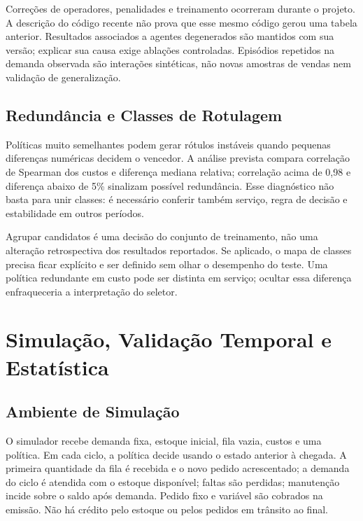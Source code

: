 Correções de operadores, penalidades e treinamento ocorreram durante o projeto. A descrição do código recente não prova que esse mesmo código gerou uma tabela anterior. Resultados associados a agentes degenerados são mantidos com sua versão; explicar sua causa exige ablações controladas. Episódios repetidos na demanda observada são interações sintéticas, não novas amostras de vendas nem validação de generalização.

\subsection{Redundância e Classes de Rotulagem}
\label{sec:redundancia_portfolio}

Políticas muito semelhantes podem gerar rótulos instáveis quando pequenas diferenças numéricas decidem o vencedor. A análise prevista compara correlação de Spearman dos custos e diferença mediana relativa; correlação acima de 0,98 e diferença abaixo de 5\% sinalizam possível redundância. Esse diagnóstico não basta para unir classes: é necessário conferir também serviço, regra de decisão e estabilidade em outros períodos.

Agrupar candidatos é uma decisão do conjunto de treinamento, não uma alteração retrospectiva dos resultados reportados. Se aplicado, o mapa de classes precisa ficar explícito e ser definido sem olhar o desempenho do teste. Uma política redundante em custo pode ser distinta em serviço; ocultar essa diferença enfraqueceria a interpretação do seletor.

\section{Simulação, Validação Temporal e Estatística}
\label{sec:simulacao_benchmark}
\subsection{Ambiente de Simulação}
\label{sec:ambiente_simulacao}

O simulador recebe demanda fixa, estoque inicial, fila vazia, custos e uma política. Em cada ciclo, a política decide usando o estado anterior à chegada. A primeira quantidade da fila é recebida e o novo pedido acrescentado; a demanda do ciclo é atendida com o estoque disponível; faltas são perdidas; manutenção incide sobre o saldo após demanda. Pedido fixo e variável são cobrados na emissão. Não há crédito pelo estoque ou pelos pedidos em trânsito ao final.

